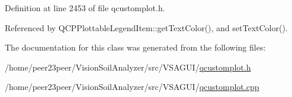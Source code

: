 Definition at line 2453 of file qcustomplot.\+h.



Referenced by Q\+C\+P\+Plottable\+Legend\+Item\+::get\+Text\+Color(), and set\+Text\+Color().



The documentation for this class was generated from the following files\+:\begin{DoxyCompactItemize}
\item 
/home/peer23peer/\+Vision\+Soil\+Analyzer/src/\+V\+S\+A\+G\+U\+I/\hyperlink{qcustomplot_8h}{qcustomplot.\+h}\item 
/home/peer23peer/\+Vision\+Soil\+Analyzer/src/\+V\+S\+A\+G\+U\+I/\hyperlink{qcustomplot_8cpp}{qcustomplot.\+cpp}\end{DoxyCompactItemize}
